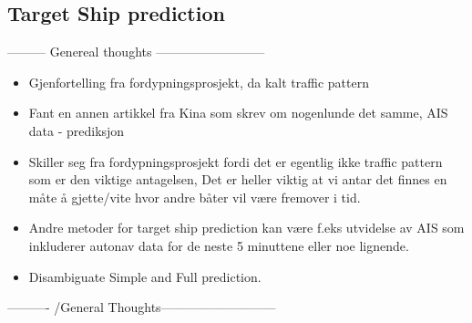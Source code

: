 \subsection{Target Ship prediction}
--------- Genereal thoughts --------------------------
\begin{itemize}
    \item Gjenfortelling fra fordypningsprosjekt, da kalt traffic pattern
    \item Fant en annen artikkel fra Kina som skrev om nogenlunde det samme, \gls{AIS} data -\> prediksjon
    \item Skiller seg fra fordypningsprosjekt fordi det er egentlig ikke traffic pattern som er den viktige antagelsen,
    Det er heller viktig at vi antar det finnes en måte å gjette/vite hvor andre båter vil være fremover i tid.
    \item Andre metoder for target ship prediction kan være f.eks utvidelse av \gls{AIS} som 
    inkluderer autonav data for de neste 5 minuttene eller noe lignende.
    \item Disambiguate Simple and Full prediction.
\end{itemize}
---------- /General Thoughts--------------------------- 

